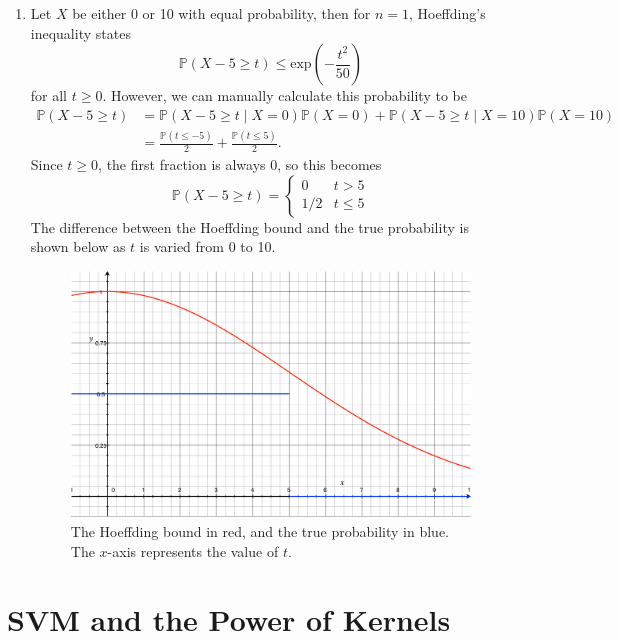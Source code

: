 \documentclass{article}
\begin{document}
\begin{enumerate}
		\item Let $X$ be either 0 or 10 with equal probability, then for $n=1$, Hoeffding's inequality states
			\[
				\mathbb{P}(X-5 \geq t) \leq \text{exp}\left( -\frac{t^2}{50}  \right)
			\] for all $t \geq 0$. However, we can manually calculate this probability to be
			\begin{align*}
				\mathbb{P}(X-5 \geq t) &= \mathbb{P}(X-5\geq t \;|\; X=0)\mathbb{P}(X=0)  + \mathbb{P}(X-5 \geq t \;|\; X=10)\mathbb{P}(X=10)  \\
							 &= \frac{\mathbb{P}(t \leq -5)}{2} + \frac{\mathbb{P}(t \leq 5)}{2}.
			\end{align*}
			Since $t \geq 0$, the first fraction is always 0, so this becomes
			\[
			\mathbb{P}(X-5 \geq t) =
			\begin{cases}
				0 & t > 5 \\
				1/2 & t \leq 5
			\end{cases}
			\] 
			The difference between the Hoeffding bound and the true probability is shown below as $t$ is varied from 0 to 10.
			\begin{figure}[H]
				\centering
				\includegraphics[scale=0.4]{fig/hoeffding.pdf}
				\caption{The Hoeffding bound in red, and the true probability in blue. The $x$-axis represents the value of $t$.}
			\end{figure}
\end{enumerate}



\section{SVM and the Power of Kernels}
\end{document}

